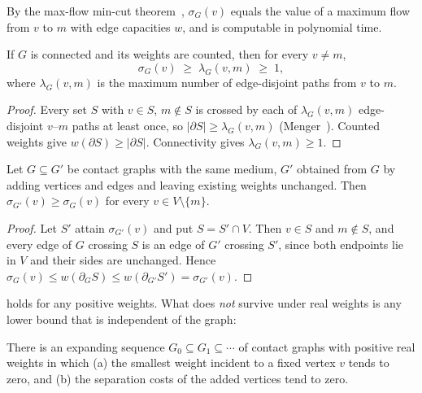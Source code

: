 \documentclass[10pt,twocolumn,a4paper]{article}
\newcommand{\med}{m}
\newcommand{\sep}{\sigma}
\newcommand{\cut}{\partial}
\begin{document}
By the max-flow min-cut theorem~\citep{ford1956}, $\sep_G(v)$ equals the
value of a maximum flow from $v$ to $\med$ with edge capacities $w$, and is
computable in polynomial time.

\begin{theorem}
\label{thm:floor}
If $G$ is connected and its weights are counted, then for every
$v\ne\med$,
\begin{equation}
\sep_G(v)\;\ge\;\lambda_G(v,\med)\;\ge\;1,
\end{equation}
where $\lambda_G(v,\med)$ is the maximum number of edge-disjoint paths from
$v$ to $\med$.
\end{theorem}

\begin{proof}
Every set $S$ with $v\in S$, $\med\notin S$ is crossed by each of
$\lambda_G(v,\med)$ edge-disjoint $v$--$\med$ paths at least once, so
$|\cut S|\ge\lambda_G(v,\med)$ (Menger~\citep{menger1927}). Counted weights
give $w(\cut S)\ge|\cut S|$. Connectivity gives $\lambda_G(v,\med)\ge1$.
\end{proof}

\begin{theorem}
\label{thm:monotone}
Let $G\subseteq G'$ be contact graphs with the same medium, $G'$ obtained
from $G$ by adding vertices and edges and leaving existing weights
unchanged. Then $\sep_{G'}(v)\ge\sep_G(v)$ for every $v\in V\setminus\{\med\}$.
\end{theorem}

\begin{proof}
Let $S'$ attain $\sep_{G'}(v)$ and put $S=S'\cap V$. Then $v\in S$ and
$\med\notin S$, and every edge of $G$ crossing $S$ is an edge of $G'$
crossing $S'$, since both endpoints lie in $V$ and their sides are
unchanged. Hence $\sep_G(v)\le w(\cut_G S)\le w(\cut_{G'}S')=\sep_{G'}(v)$.
\end{proof}

 holds for any positive weights. What does \emph{not}
survive under real weights is any lower bound that is independent of the
graph:

\begin{proposition}
\label{prop:no-floor}
There is an expanding sequence $G_0\subseteq G_1\subseteq\cdots$ of contact
graphs with positive real weights in which (a) the smallest weight incident to
a fixed vertex $v$ tends to zero, and (b) the separation costs of the added
vertices tend to zero.
\end{proposition}
\end{document}
